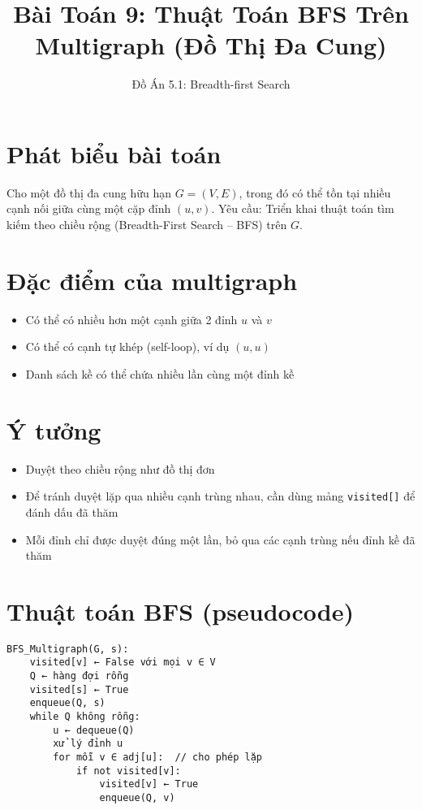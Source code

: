 \documentclass[12pt]{article}
\title{Bài Toán 9: Thuật Toán BFS Trên Multigraph (Đồ Thị Đa Cung)}
\author{Đồ Án 5.1: Breadth-first Search}
\date{}
\begin{document}
\maketitle

\section*{Phát biểu bài toán}
Cho một đồ thị đa cung hữu hạn $G = (V, E)$, trong đó có thể tồn tại nhiều cạnh nối giữa cùng một cặp đỉnh $(u,v)$.  
Yêu cầu: Triển khai thuật toán tìm kiếm theo chiều rộng (Breadth-First Search – BFS) trên $G$.

\section*{Đặc điểm của multigraph}
\begin{itemize}
    \item Có thể có nhiều hơn một cạnh giữa 2 đỉnh $u$ và $v$
    \item Có thể có cạnh tự khép (self-loop), ví dụ $(u,u)$
    \item Danh sách kề có thể chứa nhiều lần cùng một đỉnh kề
\end{itemize}

\section*{Ý tưởng}
\begin{itemize}
    \item Duyệt theo chiều rộng như đồ thị đơn
    \item Để tránh duyệt lặp qua nhiều cạnh trùng nhau, cần dùng mảng \texttt{visited[]} để đánh dấu đã thăm
    \item Mỗi đỉnh chỉ được duyệt đúng một lần, bỏ qua các cạnh trùng nếu đỉnh kề đã thăm
\end{itemize}

\section*{Thuật toán BFS (pseudocode)}
\begin{verbatim}
BFS_Multigraph(G, s):
    visited[v] ← False với mọi v ∈ V
    Q ← hàng đợi rỗng
    visited[s] ← True
    enqueue(Q, s)
    while Q không rỗng:
        u ← dequeue(Q)
        xử lý đỉnh u
        for mỗi v ∈ adj[u]:  // cho phép lặp
            if not visited[v]:
                visited[v] ← True
                enqueue(Q, v)
\end{verbatim}
\end{document}
